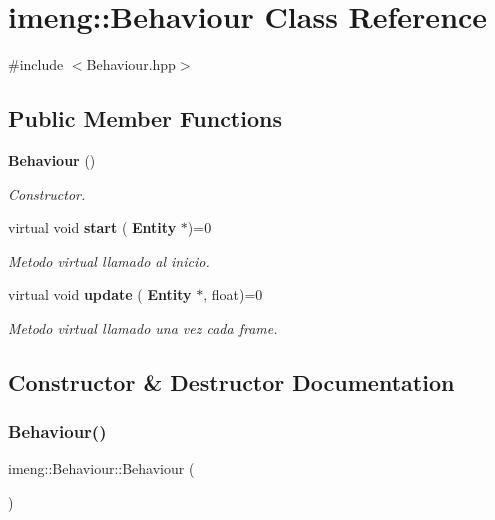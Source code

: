 \section{imeng\+::Behaviour Class Reference}
\label{classimeng_1_1_behaviour}


{\ttfamily \#include $<$Behaviour.\+hpp$>$}

\subsection*{Public Member Functions}
\begin{DoxyCompactItemize}
\item 
\textbf{ Behaviour} ()
\begin{DoxyCompactList}\small\item\em Constructor. \end{DoxyCompactList}\item 
virtual void \textbf{ start} (\textbf{ Entity} $\ast$)=0
\begin{DoxyCompactList}\small\item\em Metodo virtual llamado al inicio. \end{DoxyCompactList}\item 
virtual void \textbf{ update} (\textbf{ Entity} $\ast$, float)=0
\begin{DoxyCompactList}\small\item\em Metodo virtual llamado una vez cada frame. \end{DoxyCompactList}\end{DoxyCompactItemize}


\subsection{Constructor \& Destructor Documentation}
\mbox{\label{classimeng_1_1_behaviour_ad7c35d58329541f068780aa27268bea7}} 
\subsubsection{Behaviour()}
{\footnotesize\ttfamily imeng\+::\+Behaviour\+::\+Behaviour (\begin{DoxyParamCaption}{ }\end{DoxyParamCaption})\hspace{0.3cm}{\ttfamily [inline]}}



